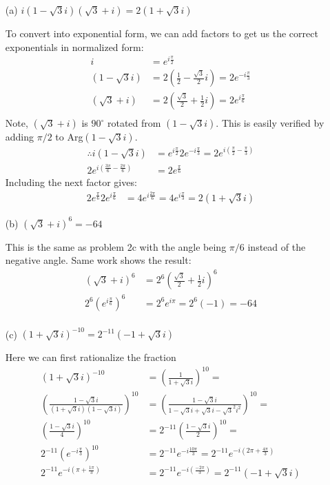 \documentclass{article}
\begin{document}
\begin{enumerate}
    \item[(a)] $i(1-\sqrt{3}i)(\sqrt{3}+i)=2(1+\sqrt{3}i)$ 

      To convert into exponential form, we can add factors to get us the correct exponentials in normalized form:
      \begin{align*}
        i &= e^{i\frac{\pi}{2}}\\
        (1-\sqrt{3}i)&= 2\left(\frac{1}{2} - \frac{\sqrt{3}}{2}i\right) = 2e^{-i\frac{\pi}{3}}\\
        (\sqrt{3}+i)&= 2\left(\frac{\sqrt{3}}{2} + \frac{1}{2}i\right) = 2e^{i\frac{\pi}{6}}\\
      \end{align*}
      Note, $(\sqrt{3}+i)$ is $90^\circ$ rotated from $(1-\sqrt{3}i)$. This is easily verified by adding $\pi/2$ to Arg$(1-\sqrt{3}i)$.
      \begin{align*}
        \therefore i(1-\sqrt{3}i) &= e^{i\frac{\pi}{2}}2e^{-i\frac{\pi}{3}} = 2e^{i\left(\frac{\pi}{2} -\frac{\pi}{3}\right)}   \\
        2e^{i\left(\frac{3\pi}{6} -\frac{2\pi}{6}\right)} &= 2e^{\frac{\pi}{6}}  
      \end{align*}
      Including the next factor gives:
      \begin{align*}
        2e^{\frac{\pi}{6}}2e^{i\frac{\pi}{6}} &= 4e^{i\frac{2\pi}{6}} =4e^{i\frac{\pi}{3}} = \boxed{2(1+\sqrt{3}i)}
      \end{align*}
  \item[(b)] $(\sqrt{3}+i)^{6}=-64$
    
    This is the same as problem 2c with the angle being $\pi/6$ instead of the negative angle. Same work shows the result:
      \begin{align*}
        (\sqrt{3}+i)^{6} &= 2^6\left(\frac{\sqrt{3}}{2}+\frac{1}{2}i\right)^{6} \\
        2^6\left(e^{i\frac{\pi}{6}}\right)^6 &= 2^6e^{i\pi} = 2^6(-1) = \boxed{-64}\\
      \end{align*}    
    \item[(c)] $(1+\sqrt{3}i)^{-10}=2^{-11}(-1+\sqrt{3}i)$

      Here we can first rationalize the fraction
      \begin{align*}
        (1+\sqrt{3}i)^{-10} &= \left(\frac{1}{1+\sqrt{3}i}\right)^{10} = \\
        \left(\frac{1-\sqrt{3}i}{(1+\sqrt{3}i)(1-\sqrt{3}i)}\right)^{10} &= \left(\frac{1-\sqrt{3}i}{1-\sqrt{3}i+\sqrt{3}i-\sqrt{3}^2i^2}\right)^{10} =\\
        \left(\frac{1-\sqrt{3}i}{4}\right)^{10} &= 2^{-11}\left(\frac{1-\sqrt{3}i}{2}\right)^{10} = \\
        2^{-11}\left(e^{-i\frac{\pi}{3}}\right)^{10} &= 2^{-11}e^{-i\frac{10\pi}{3}} = 2^{-11}e^{-i\left(2\pi+\frac{4\pi}{3}\right)}\\
        2^{-11}e^{-i\left(\pi + \frac{1\pi}{3}\right)} &= 2^{-11}e^{-i\left(\frac{-2\pi}{3}\right)} = \boxed{2^{-11}(-1+\sqrt{3}i)}
      \end{align*}
        
\end{enumerate}
\end{document}
